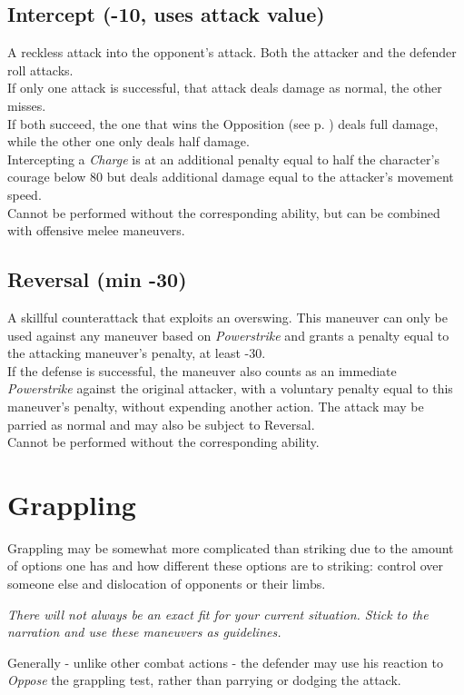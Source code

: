 \subsection*{Intercept (-10, uses attack value)}
A reckless attack into the opponent's attack. Both the attacker and the defender roll attacks.\\
If only one attack is successful, that attack deals damage as normal, the other misses.\\
If both succeed, the one that wins the Opposition (see p. \pageref{sec:opposedchecks}) deals full damage, while the other one only deals half damage.\\
Intercepting a \emph{Charge} is at an additional penalty equal to half the character’s courage below 80 but deals additional damage equal to the attacker’s movement speed.
\\%
Cannot be performed without the corresponding ability,
	but can be combined with offensive melee maneuvers.
\subsection*{Reversal (min -30)}
A skillful counterattack that exploits an overswing.
This maneuver can only be used against any maneuver based on \emph{Powerstrike}
	and grants a penalty equal to the attacking maneuver's penalty, at least -30.
\\%
If the defense is successful,
	the maneuver also counts as an immediate \emph{Powerstrike} against the original attacker,
	with a voluntary penalty equal to this maneuver’s penalty,
	without expending another action.
The attack may be parried as normal
	and may also be subject to Reversal.
\\%
Cannot be performed without the corresponding ability.

\section{Grappling}
Grappling may be somewhat more complicated than striking due to the amount of options one has and how different these options are to striking: control over someone else and dislocation of opponents or their limbs.
\begin{exampleblock}
	\itshape
	There will not always be an exact fit for your current situation.
	Stick to the narration
		and use these maneuvers as guidelines.
\end{exampleblock}
Generally - unlike other combat actions -
	the defender may use his reaction to \emph{Oppose} the grappling test,
	rather than parrying or dodging the attack.


